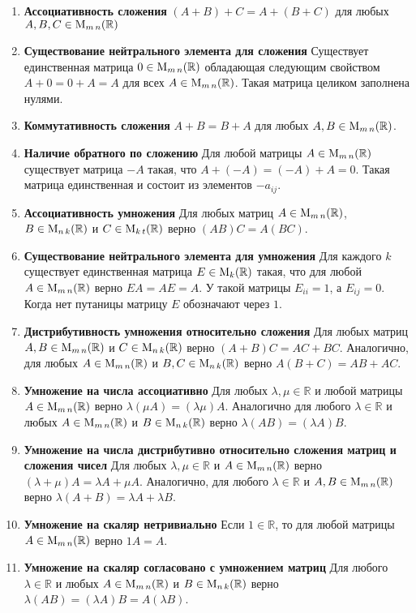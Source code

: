 \documentclass{article}
\begin{document}
\begin{enumerate}
	\item {\bf Ассоциативность сложения} $(A + B) + C = A + (B + C)$ для любых $A,B,C\in \operatorname{M}_{m\,n}(\mathbb R)$
	\item {\bf Существование нейтрального элемента для сложения} Существует единственная матрица $0\in\operatorname{M}_{m\,n}(\mathbb R)$ обладающая следующим свойством $A + 0 = 0 + A = A$ для всех $A\in\operatorname{M}_{m\,n}(\mathbb R)$. Такая матрица целиком заполнена нулями.
	
	\item {\bf Коммутативность сложения} $A + B = B + A$ для любых $A,B\in\operatorname{M}_{m\,n}(\mathbb R)$.
	
	\item {\bf Наличие обратного по сложению} Для любой матрицы $A\in\operatorname{M}_{m\,n}(\mathbb R)$ существует матрица $-A$ такая, что $A + (-A) = (-A) + A = 0$. Такая матрица единственная и состоит из элементов $-a_{ij}$.
	
	\item {\bf Ассоциативность умножения} Для любых матриц $A\in\operatorname{M}_{m\,n}(\mathbb R)$, $B\in\operatorname{M}_{n\,k}(\mathbb R)$ и $C\in\operatorname{M}_{k\,t}(\mathbb R)$ верно $(AB)C = A(BC)$.
	
	\item {\bf Существование нейтрального элемента для умножения} Для каждого $k$ существует единственная матрица $E\in\operatorname{M}_{k}(\mathbb R)$ такая, что для любой $A\in\operatorname{M}_{m\,n}(\mathbb R)$ верно $E A = A E = A$. У такой матрицы $E_{ii} = 1$, а $E_{ij} = 0$. Когда нет путаницы матрицу $E$ обозначают через $1$.
	
	\item {\bf Дистрибутивность умножения относительно сложения} Для любых матриц $A,B\in\operatorname{M}_{m\,n}(\mathbb R)$ и $C\in\operatorname{M}_{n\,k}(\mathbb R)$ верно $(A + B)C = AC + B C$. Аналогично, для любых $A\in\operatorname{M}_{m\,n}(\mathbb R)$ и $B,C\in\operatorname{M}_{n\,k}(\mathbb R)$ верно $A(B+C) = AB + AC$.
	
	\item {\bf Умножение на числа ассоциативно} Для любых $\lambda,\mu \in\mathbb R$ и любой матрицы $A\in\operatorname{M}_{m\,n}(\mathbb R)$ верно $\lambda(\mu A) = (\lambda \mu) A$. Аналогично для любого $\lambda \in \mathbb R$ и любых $A\in\operatorname{M}_{m\,n}(\mathbb R)$ и $B\in \operatorname{M}_{n\,k}(\mathbb R)$ верно $\lambda(AB) = (\lambda A) B$.
	
	\item {\bf Умножение на числа дистрибутивно относительно сложения матриц и сложения чисел} Для любых $\lambda,\mu\in \mathbb R$ и $A\in \operatorname{M}_{m\,n}(\mathbb R)$ верно $(\lambda + \mu)A = \lambda A +\mu A$. Аналогично, для любого $\lambda\in\mathbb R$ и $A,B\in\operatorname{M}_{m\,n}(\mathbb R)$ верно $\lambda(A+B) = \lambda A + \lambda B$.
	
	\item {\bf Умножение на скаляр нетривиально} Если $1\in\mathbb R$, то для любой матрицы $A\in \operatorname{M}_{m\,n}(\mathbb R)$ верно $1 A = A$.
	
	\item {\bf Умножение на скаляр согласовано с умножением матриц} Для любого $\lambda \in \mathbb R$ и любых $A\in\operatorname{M}_{m\,n}(\mathbb R)$ и $B\in\operatorname{M}_{n\,k}(\mathbb R)$ верно $\lambda(AB) = (\lambda A)B = A (\lambda B)$.
\end{enumerate}
\end{document}
